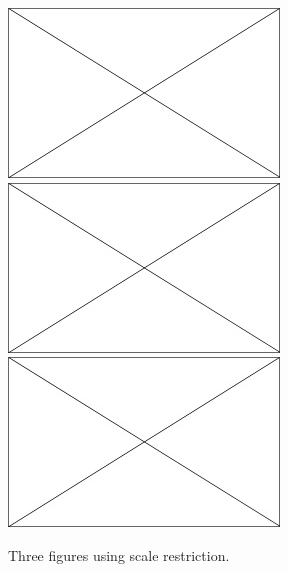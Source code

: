 \begin{figure}[H] %
	\begin{center}
		\includegraphics[keepaspectratio=true, scale = 0.5]{Figures/Chapter_1/placeholder} \includegraphics[keepaspectratio=true, scale = 0.5]{Figures/Chapter_1/placeholder} \includegraphics[keepaspectratio=true, scale = 0.5]{Figures/Chapter_1/placeholder} \caption{
			\label{figure_9} Three figures using scale restriction.}
		\vspace{-0.5cm}
	\end{center}
\end{figure}
